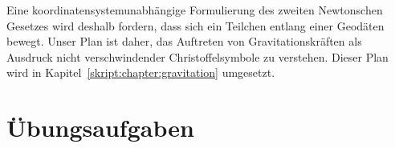 Eine koordinatensystemunabhängige Formulierung des zweiten Newtonschen
Gesetzes wird deshalb fordern, dass sich ein Teilchen entlang einer
Geodäten bewegt.
Unser Plan ist daher, das Auftreten von Gravitationskräften als
Ausdruck nicht verschwindender Christoffelsymbole zu verstehen.
Dieser Plan wird in Kapitel~\ref{skript:chapter:gravitation}
umgesetzt.


\section*{Übungsaufgaben}

